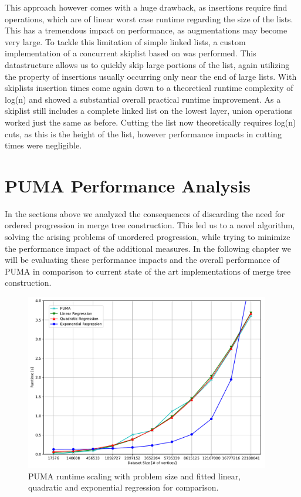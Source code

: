 \documentclass{scrartcl}
\begin{document}
This approach however comes with a huge drawback, as insertions require find operations, which are of linear worst case runtime regarding the size of the lists. This has a tremendous impact on performance, as augmentations may become very large. To tackle this limitation of simple linked lists, a custom implementation of a concurrent skiplist based on \cite{skiplist} was performed. This datastructure allows us to quickly skip large portions of the list, again utilizing the property of insertions usually occurring only near the end of large lists. With skiplists insertion times come again down to a theoretical runtime complexity of log(n) and showed a substantial overall practical runtime improvement. As a skiplist still includes a complete linked list on the lowest layer, union operations worked just the same as before. Cutting the list now theoretically requires log(n) cuts, as this is the height of the list, however performance impacts in cutting times were negligible.

\section{PUMA Performance Analysis}
In the sections above we analyzed the consequences of discarding the need for ordered progression in merge tree construction. This led us to a novel algorithm, solving the arising problems of unordered progression, while trying to minimize the performance impact of the additional measures. In the following chapter we will be evaluating these performance impacts and the overall performance of PUMA in comparison to current state of the art implementations of merge tree construction.
\begin{figure}[h]
\centering
\includegraphics[width=0.95\textwidth]{figures/datscale.pdf}
\caption{PUMA runtime scaling with problem size and fitted linear, quadratic and exponential regression for comparison.}
\label{fig:datscale}
\end{figure}
\end{document}
